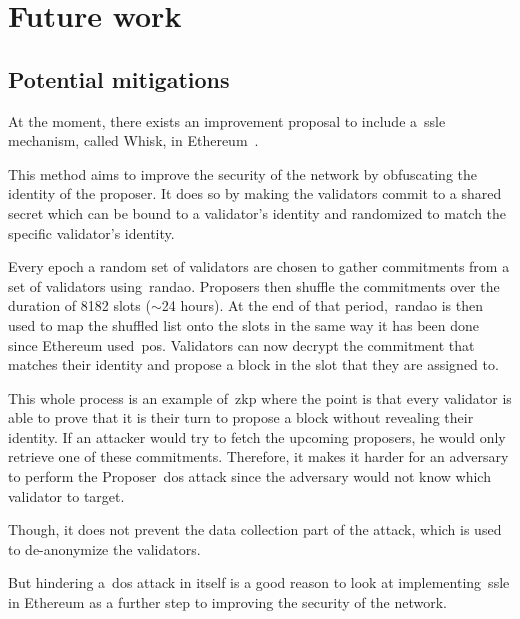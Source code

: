 

\section{Future work}\label{sec:future-works}

\subsection{Potential mitigations}\label{subsec:potential-mitigations}
At the moment, there exists an improvement proposal
to include a~\gls{ssle} mechanism, called Whisk, in Ethereum~\cite{EthereumResearchSSLE2024}.

This method aims to improve the security of the network by obfuscating the identity of the proposer.
It does so by making the validators commit to a shared secret which can be bound to a validator's identity and randomized to match the specific validator's identity.

Every epoch a random set of validators are chosen to gather commitments from a set of validators using~\gls{randao}.
Proposers then shuffle the commitments over the duration of 8182 slots ($\sim$24 hours).
At the end of that period,~\gls{randao} is then used to map the shuffled list onto the slots in the same way it has been done since Ethereum used~\gls{pos}.
Validators can now decrypt the commitment that matches their identity and propose a block in the slot that they are assigned to.

This whole process is an example of~\gls{zkp} where the point is that every validator is able to prove that it is their turn to propose a block without revealing their identity.
If an attacker would try to fetch the upcoming proposers, he would only retrieve one of these commitments.
Therefore, it makes it harder
for an adversary to perform the Proposer~\gls{dos} attack since the adversary would not know which validator to target.

Though, it does not prevent the data collection part of the attack, which is used to de-anonymize the validators.

But hindering a~\gls{dos} attack in itself is a good reason
to look at implementing~\gls{ssle} in Ethereum as a further step to improving the security of the network.


